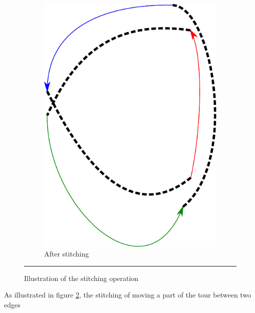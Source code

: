 \documentclass[fontsize=9pt,twocolumns,enabledeprecatedfontcommands]{scrartcl}
\begin{document}
\begin{figure}
\begin{subfigure}{0.5\textwidth}
		\centering
		\includegraphics[angle=90,width=0.9\linewidth,height=0.15\textheight]{stitch2}
		\caption{After stitching}
		\label{stitch2}
		
	\end{subfigure}
	\captionsetup{format=plain}
	\caption{Illustration of the stitching operation}
	\label{stitch_fig}
	\centering
	\rule{0.10\textwidth}{0.5pt}
	\vspace{-0.75em}
\end{figure}

As illustrated in figure \ref{stitch_fig}, the stitching of moving a part of the tour between two edges


\end{document}

